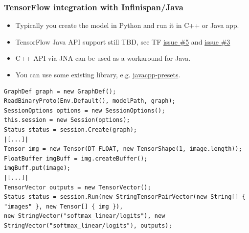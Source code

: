 \documentclass[10pt,utf8]{beamer}
\begin{document}
\begin{frame}[fragile]
	\frametitle{TensorFlow integration with Infinispan/Java}
	\vspace{-0.1cm}
	\begin{itemize}
		\item Typically you create the model in Python and run it in C++ or Java app.
		\item TensorFlow Java API support still TBD, see TF \color{blue}\href{https://github.com/tensorflow/tensorflow/issues/5}{issue \#5}\color{black} and \color{blue}\href{https://github.com/tensorflow/tensorflow/issues/3}{issue \#3}\color{black}
		\item C++ API via JNA can be used as a workaround for Java.
		\item You can use some existing library, e.g. \color{blue}\href{https://github.com/bytedeco/javacpp-presets}{javacpp-presets}\color{black}.
	\end{itemize}
	\begin{lstlisting}[style=Java]
GraphDef graph = new GraphDef();
ReadBinaryProto(Env.Default(), modelPath, graph);
SessionOptions options = new SessionOptions();
this.session = new Session(options);
Status status = session.Create(graph);
|[...]|
Tensor img = new Tensor(DT_FLOAT, new TensorShape(1, image.length));
FloatBuffer imgBuff = img.createBuffer();
imgBuff.put(image);
|[...]|
TensorVector outputs = new TensorVector();
Status status = session.Run(new StringTensorPairVector(new String[] { "images" }, new Tensor[] { img }),
new StringVector("softmax_linear/logits"), new StringVector("softmax_linear/logits"), outputs);
	\end{lstlisting}
\end{frame}
\end{document}
